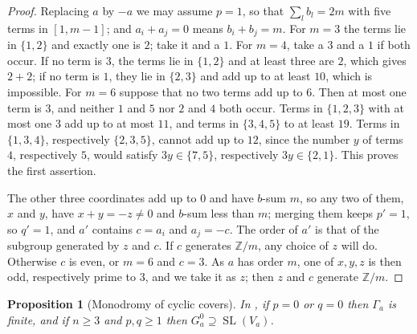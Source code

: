 \documentclass[11pt,reqno]{amsart}
\theoremstyle{plain}
\newtheorem{proposition}[theorem]{Proposition}
\theoremstyle{definition}
\theoremstyle{remark}
\newcommand{\ZZ}{\mathbb{Z}}
\DeclareMathOperator{\SL}{SL}
\begin{document}
\begin{proof}
Replacing $a$ by $-a$ we may assume $p=1$, so that $\sum_{l}b_{l}=2m$ with
five terms in $[1,m-1]$; and $a_{i}+a_{j}=0$ means $b_{i}+b_{j}=m$. For $m=3$
the terms lie in $\{1,2\}$ and exactly one is $2$; take it and a $1$. For
$m=4$, take a $3$ and a $1$ if both occur. If no term is $3$, the terms lie in
$\{1,2\}$ and at least three are $2$, which gives $2+2$; if no term is $1$,
they lie in $\{2,3\}$ and add up to at least $10$, which is impossible. For
$m=6$ suppose that no two terms add up to $6$. Then at most one term is $3$,
and neither $1$ and $5$ nor $2$ and $4$ both occur. Terms in $\{1,2,3\}$ with
at most one $3$ add up to at most $11$, and terms in $\{3,4,5\}$ to at least
$19$. Terms in $\{1,3,4\}$, respectively $\{2,3,5\}$, cannot add up to $12$,
since the number $y$ of terms $4$, respectively $5$, would satisfy
$3y\in\{7,5\}$, respectively $3y\in\{2,1\}$. This proves the first assertion.

The other three coordinates add up to $0$ and have $b$-sum $m$, so any two of
them, $x$ and $y$, have $x+y=-z\ne0$ and $b$-sum less than $m$; merging them
keeps $p'=1$, so $q'=1$, and $a'$ contains $c=a_{i}$ and $a_{j}=-c$. The order
of $a'$ is that of the subgroup generated by $z$ and $c$. If $c$ generates
$\ZZ/m$, any choice of $z$ will do. Otherwise $c$ is even, or $m=6$ and $c=3$.
As $a$ has order $m$, one of $x,y,z$ is then odd, respectively prime to $3$,
and we take it as $z$; then $z$ and $c$ generate $\ZZ/m$.
\end{proof}

\begin{proposition}[Monodromy of cyclic covers]\label{prop:cyclicmonodromy}
In , if $p=0$ or $q=0$ then $\Gamma_{a}$ is finite, and if
$n\ge3$ and $p,q\ge1$ then $G_{a}^{0}\supseteq\SL(V_{a})$.
\end{proposition}
\end{document}
